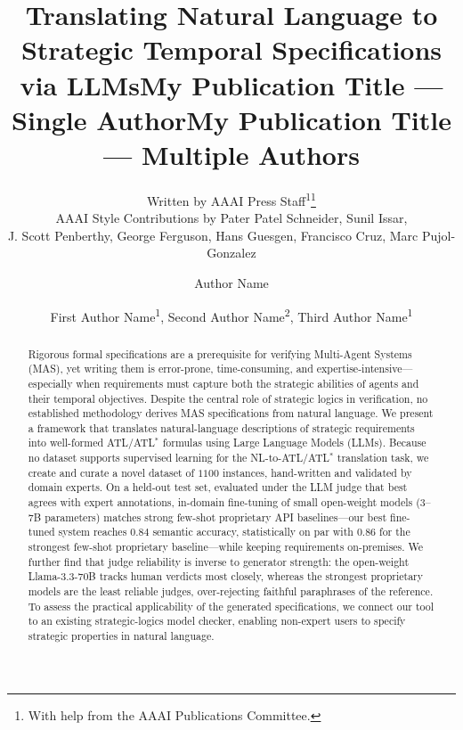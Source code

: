 \documentclass[letterpaper]{article} %
\title{Translating Natural Language to Strategic
Temporal Specifications via LLMs}
\author{
    Written by AAAI Press Staff\textsuperscript{\rm 1}\thanks{With help from the AAAI Publications Committee.}\\
    AAAI Style Contributions by Pater Patel Schneider,
    Sunil Issar,\\
    J. Scott Penberthy,
    George Ferguson,
    Hans Guesgen,
    Francisco Cruz\equalcontrib,
    Marc Pujol-Gonzalez\equalcontrib
}
\title{My Publication Title --- Single Author}
\author {
    Author Name
}
\title{My Publication Title --- Multiple Authors}
\author {
    First Author Name\textsuperscript{\rm 1},
    Second Author Name\textsuperscript{\rm 2},
    Third Author Name\textsuperscript{\rm 1}
}
\begin{document}
\maketitle


\begin{abstract}
Rigorous formal specifications are a prerequisite for verifying Multi-Agent Systems (MAS), yet writing them is error-prone, time-consuming, and expertise-intensive---especially when requirements must capture both the strategic abilities of agents and their temporal objectives. Despite the central role of strategic logics in verification, no established methodology derives MAS specifications from natural language. We present a framework that translates natural-language descriptions of strategic requirements into well-formed ATL/ATL$^*$ formulas using Large Language Models (LLMs). Because no dataset supports supervised learning for the NL-to-ATL/ATL$^*$ translation task, we create and curate a novel dataset of $1100$ instances, hand-written and validated by domain experts. On a held-out test set, evaluated under the LLM judge that best agrees with expert annotations, in-domain fine-tuning of small open-weight models ($3$--$7$B parameters) matches strong few-shot proprietary API baselines---our best fine-tuned system reaches $0.84$ semantic accuracy, statistically on par with $0.86$ for the strongest few-shot proprietary baseline---while keeping requirements on-premises. We further find that judge reliability is inverse to generator strength: the open-weight Llama-3.3-70B tracks human verdicts most closely, whereas the strongest proprietary models are the least reliable judges, over-rejecting faithful paraphrases of the reference. To assess the practical applicability of the generated specifications, we connect our tool to an existing strategic-logics model checker, enabling non-expert users to specify strategic properties in natural language.
\end{abstract}
\end{document}
